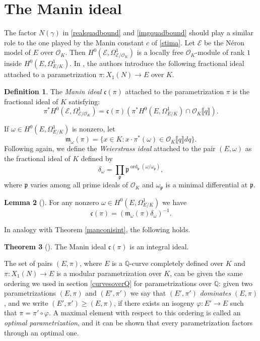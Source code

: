\documentclass[11pt]{amsart}
\theoremstyle{definition}
\newtheorem{definizione}{Definition}[section]
\newtheorem{thm}[definizione]{Theorem}
\newtheorem{lem}[definizione]{Lemma}
\begin{document}
		\section{The Manin ideal}\label{manid}
		The factor $N(\gamma)$ in \eqref{realquadbound} and \eqref{imgquadbound} should play a similar role to the one played by the Manin constant $c$ of \eqref{stima}. Let $\mathcal E$ be the N\'{e}ron model of $E$ over ${\mathcal{O}}_K$. Then $H^0(\mathcal E,\Omega_{\mathcal E/{\mathcal{O}}_K}^1)$ is a locally free ${\mathcal{O}}_K$-module of rank $1$ inside $H^0(E,\Omega_{E/K}^1)$. In \cite{gola}, the authors introduce the following fractional ideal attached to a parametrization $\pi\colon X_1(N)\to E$ over $K$.
			\begin{definizione}
				The \emph{Manin ideal} $\mathfrak c(\pi)$ attached to the parametrization $\pi$ is the fractional ideal of $K$ satisfying:
				$$\pi^*H^0(\mathcal E,\Omega_{\mathcal E/{\mathcal{O}}_K}^1)=\mathfrak c(\pi)\left(\pi^*H^0(E,\Omega_{E/K}^1)\cap {\mathcal{O}}_K\llbracket q\rrbracket\right).$$
		\end{definizione}
		If $\omega\in H^0(E,\Omega_{E/K}^1)$ is nonzero, let
		$$\mathfrak m_{\omega}(\pi)=\{x\in K\colon x\cdot \pi^*(\omega)\in {\mathcal{O}}_K\llbracket q\rrbracket dq\}.$$
		Following \cite{gola} again, we define the \emph{Weierstrass ideal} attached to the pair $(E,\omega)$ as the fractional ideal of $K$ defined by
				$$\delta_{\omega}=\prod_{\mathfrak{p}} {\mathfrak{p}}^{\operatorname{ord}_{\mathfrak{p}}(\omega/\omega_{\mathfrak{p}})},$$
		where ${\mathfrak{p}}$ varies among all prime ideals of ${\mathcal{O}}_K$ and $\omega_{\mathfrak{p}}$ is a minimal differential at ${\mathfrak{p}}$.
			\begin{lem}[\cite{gola}]
				For any nonzero $\omega\in H^0(E,\Omega_{E/K}^1)$ we have
					$$\mathfrak c(\pi)=(\mathfrak m_{\omega}(\pi)\delta_{\omega})^{-1}.$$
		\end{lem}
		In analogy with Theorem \ref{manconisint}, the following holds.
			\begin{thm}[\cite{gola}]
				The Manin ideal $\mathfrak c(\pi)$ is an integral ideal.
		\end{thm}
		The set of pairs $(E,\pi)$, where $E$ is a ${\mathbb{Q}}$-curve completely defined over $K$ and $\pi\colon X_1(N)\to E$ is a modular parametrization over $K$, can be given the same ordering we used in section \ref{curvesoverQ} for parametrizations over ${\mathbb{Q}}$: given two parametrizations $(E,\pi)$ and $(E',\pi')$ we say that $(E',\pi')$ \emph{dominates} $(E,\pi)$, and we write $(E',\pi')\geq (E,\pi)$, if there exists an isogeny $\varphi\colon E'\to E$ such that $\pi=\pi'\circ \varphi$. A maximal element with respect to this ordering is called an \emph{optimal parametrization}, and it can be shown that every parametrization factors through an optimal one.
\end{document}
